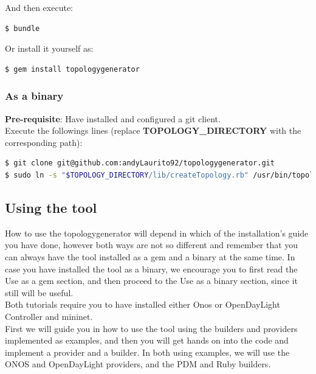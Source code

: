 And then execute:

\begin{lstlisting}[language=bash,breaklines=true]
$ bundle
\end{lstlisting}

Or install it yourself as: 

\begin{lstlisting}[language=bash,breaklines=true]
$ gem install topologygenerator
\end{lstlisting}

\subsubsection{As a binary}

\textbf{Pre-requisite}: Have installed and configured a git client. \\

Execute the followings lines (replace \textbf{TOPOLOGY\_DIRECTORY} with the corresponding path):

\begin{lstlisting}[language=bash,breaklines=true]
$ git clone git@github.com:andyLaurito92/topologygenerator.git
$ sudo ln -s "$TOPOLOGY_DIRECTORY/lib/createTopology.rb" /usr/bin/topologygenerator
\end{lstlisting}

\subsection{Using the tool}

How to use the topologygenerator will depend in which of the installation's guide you have done, however both ways are not so different and remember that you can always have the tool installed as a gem and a binary at the same time. In case you have installed the tool as a binary, we encourage you to first read the Use as a gem section, and then proceed to the Use as a binary section, since it still will be useful. \\
Both tutorials require you to have installed either Onos or OpenDayLight Controller and mininet. \\
First we will guide you in how to use the tool using the builders and providers implemented as examples, and then you will get hands on into the code and implement a provider and a builder. In both using examples, we will use the ONOS and OpenDayLight providers, and the PDM and Ruby builders. \\

